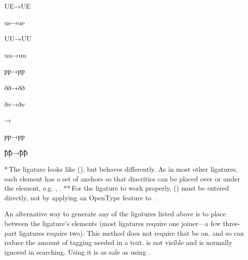 \begin{multicols}{5}
{\color[rgb]{0.38039216,0.09019608,0.16078432}
U{\textcompwordmark}E\hfill→\hfill{}UE}

{\color[rgb]{0.38039216,0.09019608,0.16078432}
u{\textcompwordmark}e\hfill→\hfill{}ue}

{\color[rgb]{0.38039216,0.09019608,0.16078432}
U{\textcompwordmark}U\hfill→\hfill{}UU}

{\color[rgb]{0.38039216,0.09019608,0.16078432}
u{\textcompwordmark}u\hfill→\hfill{}uu}

{\color[rgb]{0.38039216,0.09019608,0.16078432}
ƿ{\textcompwordmark}ƿ\hfill→\hfill{}ƿƿ}

{\color[rgb]{0.38039216,0.09019608,0.16078432}
}

{\color[rgb]{0.38039216,0.09019608,0.16078432}
}

{\color[rgb]{0.38039216,0.09019608,0.16078432}
ð{\textcompwordmark}ð\hfill→\hfill{}ðð}

{\color[rgb]{0.38039216,0.09019608,0.16078432}
ð{\textcompwordmark}v\hfill→\hfill{}ðv}

{\color[rgb]{0.38039216,0.09019608,0.16078432}
{\th}\textcompwordmark{\th}\hfill→\hfill{}{\th}{\th}}

{\color[rgb]{0.38039216,0.09019608,0.16078432}
ƿ{\textcompwordmark}ƿ\hfill→\hfill{}ƿƿ}

{\color[rgb]{0.38039216,0.09019608,0.16078432}
ꝥ{\textcompwordmark}ꝥ\hfill→\hfill{}ꝥꝥ}

\end{multicols}

\noindent{}
*\,The  ligature looks like  (), but behaves differently.
As in most other ligatures, each element has a set of anchors so that diacritics can be placed 
over or under the element, e.g. ,
.
**\,For the ligature  to
work properly,  () must be entered directly, not by applying an OpenType feature to
.

An alternative way to generate any of the ligatures listed above is to place
 
between the ligature’s elements (most ligatures require one joiner—a few three-part ligatures require
two). This method does not require that  be on, and so can reduce 
the amount of tagging needed in a text.  is not visible and is normally ignored in searching.
Using it is as safe as using .

